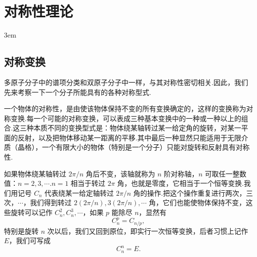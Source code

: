 \chapter{对称性理论}
\emergencystretch 3em

\section{对称变换}

多原子分子中的谱项分类和双原子分子中一样，与其对称性密切相关.因此，我们先来考察一下一个分子所能具有的各种对称型式.

一个物体的对称性，是由使该物体保持不变的所有变换确定的，这样的变换称为对称变换.每一个可能的对称变换，可以表成三种基本变换中的一种或一种以上的组合.这三种本质不同的变换型式是：物体绕某轴转过某一给定角的旋转，对某一平面的反射，以及把物体移动某一距离的平移.其中最后一种显然只能适用于无限介质（晶格），一个有限大小的物体（特别是一个分子）只能对旋转和反射具有对称性.

如果物体绕某轴转过 $2\pi/n$ 角后不变，该轴就称为 $n$ 阶对称轴，$n$ 可取任一整数值：$n=2,3,\cdots$.$n=1$ 相当于转过 $2\pi$ 角，也就是零度，它相当于一个恒等变换.我们用记号 $C_n$ 代表绕某一给定轴转过 $2\pi/n$ 角的操作.把这个操作重复进行两次，三次，$\cdots$，我们得到转过 $2(2\pi/n),3(2\pi/n),\cdots$ 角，它们也能使物体保持不变，这些旋转可以记作 $C_n^2,C_n^3,\cdots$，如果 $p$ 能除尽 $n$，显然有
\begin{equation}
  C_n^p=C_{n/p},
\end{equation}
特别是旋转 $n$ 次以后，我们又回到原位，即实行一次恒等变换，后者习惯上记作 $E$，我们可写成
\begin{equation}
  C_n^n=E.
\end{equation}

